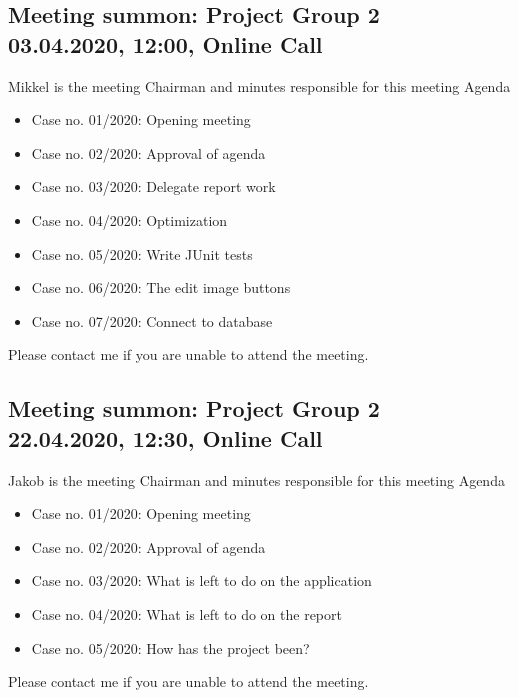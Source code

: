 \documentclass{article}
\begin{document}
\subsection[Meeting summon: Project Group 2]{Meeting summon: Project Group 2\\ {\large 03.04.2020, 12:00, Online Call}}

Mikkel is the meeting Chairman and minutes responsible for this meeting
\newline
\newline
\large Agenda 
\begin{itemize}
    \item Case no. 01/2020:  Opening meeting
    \item Case no. 02/2020:  Approval of agenda
    \item Case no. 03/2020:  Delegate report work
    \item Case no. 04/2020:  Optimization
    \item Case no. 05/2020:  Write JUnit tests
    \item Case no. 06/2020:  The edit image buttons
    \item Case no. 07/2020:  Connect to database
\end{itemize}
\newline
\newline
Please contact me if you are unable to attend the meeting.
\newpage

\subsection[Meeting summon: Project Group 2]{Meeting summon: Project Group 2\\ {\large 22.04.2020, 12:30, Online Call}}

Jakob is the meeting Chairman and minutes responsible for this meeting
\newline
\newline
\large Agenda 
\begin{itemize}
    \item Case no. 01/2020:  Opening meeting
    \item Case no. 02/2020:  Approval of agenda
    \item Case no. 03/2020:  What is left to do on the application
    \item Case no. 04/2020:  What is left to do on the report
    \item Case no. 05/2020:  How has the project been?
\end{itemize}
\newline
\newline
Please contact me if you are unable to attend the meeting.
\end{document}
